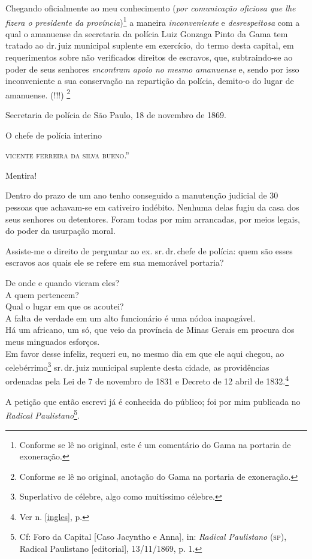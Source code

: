 Chegando oficialmente ao meu conhecimento (\emph{por comunicação
oficiosa que lhe fizera o presidente da província})\footnote{Conforme
  se lê no original, este é um comentário do Gama na portaria de
  exoneração.} a maneira \emph{inconveniente} e \emph{desrespeitosa} com
a qual o amanuense da secretaria da polícia Luiz Gonzaga Pinto da Gama
tem tratado ao dr.\,juiz municipal suplente em exercício, do termo desta
capital, em requerimentos sobre não verificados direitos de escravos,
que, subtraindo-se ao poder de seus senhores \emph{encontram apoio no
mesmo amanuense} e, sendo por isso inconveniente a sua conservação na
repartição da polícia, demito-o do lugar de amanuense. (!!!) \footnote{
  Conforme se lê no original, anotação do Gama na portaria de
  exoneração.}
\begin{flushright}
Secretaria de polícia de São Paulo, 18 de novembro de 1869.

O chefe de polícia interino

\textsc{vicente ferreira da silva bueno}.''
\end{flushright}
Mentira!

Dentro do prazo de um ano tenho conseguido a manutenção judicial de 30
pessoas que achavam-se em cativeiro indébito. Nenhuma delas fugiu da
casa dos seus senhores ou detentores. Foram todas por mim arrancadas,
por meios legais, do poder da usurpação moral.

Assiste-me o direito de perguntar ao ex. sr.\,dr.\,chefe de polícia: quem
são esses escravos aos quais ele se refere em sua memorável portaria?

De onde e quando vieram eles?\\
A quem pertencem?\\
Qual o lugar em que os acoutei?\\
A falta de verdade em um alto funcionário é uma nódoa inapagável.\\
Há um africano, um só, que veio da província de Minas Gerais em procura
dos meus minguados esforços.\\
Em favor desse infeliz, requeri eu, no mesmo dia em que ele aqui chegou,
ao celebérrimo\footnote{Superlativo de célebre, algo como muitíssimo
  célebre.} sr.\,dr.\,juiz municipal suplente desta cidade, as
providências ordenadas pela Lei de 7 de novembro de 1831 e Decreto de 12
abril de 1832.\footnote{Ver n. \ref{ingles}, p. \pageref{ingles}}

A petição que então escrevi já é conhecida do público; foi por mim
publicada no \emph{Radical Paulistano}\footnote{Cf: Foro da Capital
  {[}Caso Jacyntho e Anna{]}, in: \emph{Radical Paulistano} (\textsc{sp}),
  Radical Paulistano {[}editorial{]}, 13/11/1869, p. 1.}.

